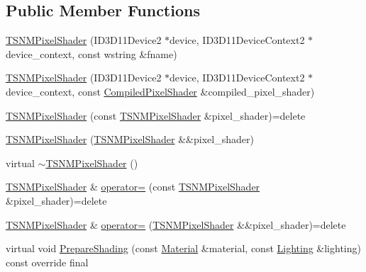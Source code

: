 \subsection*{Public Member Functions}
\begin{DoxyCompactItemize}
\item 
\hyperlink{classmage_1_1_t_s_n_m_pixel_shader_af5ff9bfc033ea0fc1cf4c747cbe2c3c9}{T\+S\+N\+M\+Pixel\+Shader} (I\+D3\+D11\+Device2 $\ast$device, I\+D3\+D11\+Device\+Context2 $\ast$device\+\_\+context, const wstring \&fname)
\item 
\hyperlink{classmage_1_1_t_s_n_m_pixel_shader_aa04056a841bae6945546772dd298c5f4}{T\+S\+N\+M\+Pixel\+Shader} (I\+D3\+D11\+Device2 $\ast$device, I\+D3\+D11\+Device\+Context2 $\ast$device\+\_\+context, const \hyperlink{structmage_1_1_compiled_pixel_shader}{Compiled\+Pixel\+Shader} \&compiled\+\_\+pixel\+\_\+shader)
\item 
\hyperlink{classmage_1_1_t_s_n_m_pixel_shader_af01a39116e8759ecd28aaba009c8b8ad}{T\+S\+N\+M\+Pixel\+Shader} (const \hyperlink{classmage_1_1_t_s_n_m_pixel_shader}{T\+S\+N\+M\+Pixel\+Shader} \&pixel\+\_\+shader)=delete
\item 
\hyperlink{classmage_1_1_t_s_n_m_pixel_shader_a4889850bd4ff6c3a3d22c9637752ce37}{T\+S\+N\+M\+Pixel\+Shader} (\hyperlink{classmage_1_1_t_s_n_m_pixel_shader}{T\+S\+N\+M\+Pixel\+Shader} \&\&pixel\+\_\+shader)
\item 
virtual \hyperlink{classmage_1_1_t_s_n_m_pixel_shader_ae7c20ffb872faffb28714b39916e4250}{$\sim$\+T\+S\+N\+M\+Pixel\+Shader} ()
\item 
\hyperlink{classmage_1_1_t_s_n_m_pixel_shader}{T\+S\+N\+M\+Pixel\+Shader} \& \hyperlink{classmage_1_1_t_s_n_m_pixel_shader_a8c9bc92d544b088e9530f8f47df2b4a6}{operator=} (const \hyperlink{classmage_1_1_t_s_n_m_pixel_shader}{T\+S\+N\+M\+Pixel\+Shader} \&pixel\+\_\+shader)=delete
\item 
\hyperlink{classmage_1_1_t_s_n_m_pixel_shader}{T\+S\+N\+M\+Pixel\+Shader} \& \hyperlink{classmage_1_1_t_s_n_m_pixel_shader_a0d714c73017f9bb9b273b2d2a276ab5f}{operator=} (\hyperlink{classmage_1_1_t_s_n_m_pixel_shader}{T\+S\+N\+M\+Pixel\+Shader} \&\&pixel\+\_\+shader)=delete
\item 
virtual void \hyperlink{classmage_1_1_t_s_n_m_pixel_shader_abe01a4e6007a0a1ca98ed8fe48523138}{Prepare\+Shading} (const \hyperlink{structmage_1_1_material}{Material} \&material, const \hyperlink{structmage_1_1_lighting}{Lighting} \&lighting) const override final
\end{DoxyCompactItemize}
